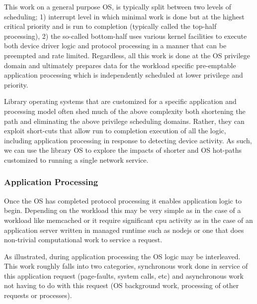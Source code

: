 
This work on a general purpose OS, is typically split between two levels of scheduling; 1) interrupt level in which minimal work is done but at the highest critical priority and is run to completion (typically called the top-half processing), 2) the so-called bottom-half uses various kernel facilities to execute both device driver logic and protocol processing in a manner that can be preempted and rate limited.  Regardless, all this work is done at the OS privilege domain and ultimately prepares data for the workload specific pre-emptable application processing which is independently scheduled at lower privilege and priority. %

Library operating systems that are customized for a specific application and processing model often shed much of the above complexity both shortening the path and eliminating the above privilege scheduling domains\cite{10.1145/2997641,10.1145/2812806,EbbRT}.  Rather, they can exploit short-cuts that allow run to completion execution of all the logic, including application processing in response to detecting device activity.  As such, we can use the library OS to explore the impacts of shorter and OS hot-paths customized to running a single network service.  

\subsubsection{Application Processing}
\label{sec:workflow:appproc}

Once the OS has completed protocol processing it enables application logic to begin.  Depending on the workload this may be very simple as in the case of a workload like memcached or it require significant cpu activity as in the case of  an application server written in managed runtime such as nodejs or one that does non-trivial computational work to service a request. 

As illustrated, during application processing the OS logic may be interleaved.  This work roughly falls into two categories, synchronous work done in service of this application request (page-faults, system calls, etc) and asynchronous work not having to do with this request (OS background work, processing of other requests or processes).

